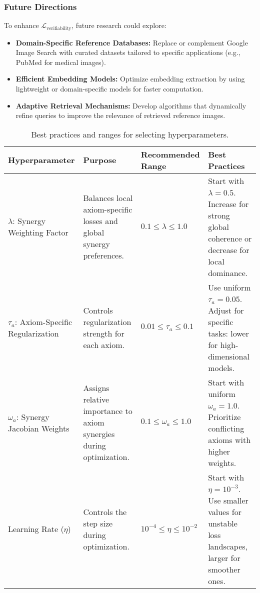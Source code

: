 \subsubsection{Future Directions}
To enhance \(\mathcal{L}_{\text{verifiability}}\), future research could explore:
\begin{itemize}
    \item \textbf{Domain-Specific Reference Databases:} Replace or complement Google Image Search with curated datasets tailored to specific applications (e.g., PubMed for medical images).
    \item \textbf{Efficient Embedding Models:} Optimize embedding extraction by using lightweight or domain-specific models for faster computation.
    \item \textbf{Adaptive Retrieval Mechanisms:} Develop algorithms that dynamically refine queries to improve the relevance of retrieved reference images.
\end{itemize}




\begin{table*}[ht]
    \centering
    \renewcommand{\arraystretch}{1.3}
    \begin{tabularx}{\textwidth}{|l|X|l|X|}
        \hline
        \textbf{Hyperparameter} & \textbf{Purpose} & \textbf{Recommended Range} & \textbf{Best Practices} \\
        \hline
        \(\lambda\): Synergy Weighting Factor & Balances local axiom-specific losses and global synergy preferences. & \(0.1 \leq \lambda \leq 1.0\) & Start with \(\lambda = 0.5\). Increase for strong global coherence or decrease for local dominance. \\
        \hline
        \(\tau_a\): Axiom-Specific Regularization & Controls regularization strength for each axiom. & \(0.01 \leq \tau_a \leq 0.1\) & Use uniform \(\tau_a = 0.05\). Adjust for specific tasks: lower for high-dimensional models. \\
        \hline
        \(\omega_a\): Synergy Jacobian Weights & Assigns relative importance to axiom synergies during optimization. & \(0.1 \leq \omega_a \leq 1.0\) & Start with uniform \(\omega_a = 1.0\). Prioritize conflicting axioms with higher weights. \\
        \hline
        Learning Rate (\(\eta\)) & Controls the step size during optimization. & \(10^{-4} \leq \eta \leq 10^{-2}\) & Start with \(\eta = 10^{-3}\). Use smaller values for unstable loss landscapes, larger for smoother ones. \\
        \hline
    \end{tabularx}
    \caption{Best practices and ranges for selecting hyperparameters.}
    \label{tab:hyperparameter_selection}
\end{table*}


